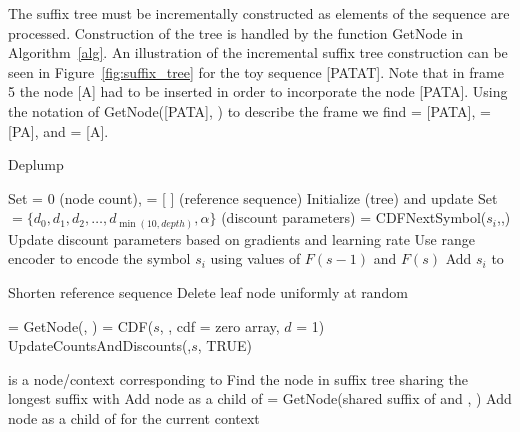 The suffix tree must be incrementally constructed as elements of the sequence are processed.  Construction of the tree is handled by the function GetNode in Algorithm~\ref{alg}.  An illustration of the incremental suffix tree construction can be seen in Figure~\ref{fig:suffix_tree} for the toy sequence [PATAT].  Note that in frame 5 the node [A] had to be inserted in order to incorporate the node [PATA].  Using the notation of GetNode([PATA], \T) to describe the frame we find \N \space = [PATA], \M \space = [PA],  and \PP\space = [A].

\begin{algorithm}
    \caption{Deplump} \label{alg}
    \begin{algorithmic}[1]
    
		\State Set \nc \space = 0 (node count), \RS \space = [ ] (reference sequence)
		\State Initialize \T \space (tree) and update \nc
		\State Set \D \space $= \{ d_0, d_1, d_2, \dots, d_{\min(10,depth)}, \alpha \}$ (discount parameters)
			\State [$F(s-1), F(s)$] = CDFNextSymbol($s_i$,\T,\RS)
			\State Update discount parameters based on gradients and learning rate
			\State Use range encoder to encode the symbol $s_i$ using values of $F(s-1)$ and  $F(s)$
			\State Add $s_i$ to \RS
		\EndFor
	\EndProcedure
	
			\State Shorten reference sequence
		\EndWhile
			\State Delete leaf node uniformly at random
		\EndWhile
		
		\State \N =  GetNode(\RS, \T)
		\State [$F(s-1), F(s)$] = CDF($s$, \N, cdf = zero array, $d$ = 1)
		\State UpdateCountsAndDiscounts(\N,$s$, TRUE)
		\State \Return [$F(s-1), F(s)$]
	\EndFunction
	
		\State \N \space is a node/context corresponding to \RS
		\State Find the node \M \space in suffix tree sharing the longest suffix with \N
				\State Add node \N \space as a child of \M
				\State \Return \N
			\Else
				\State \Return \M
			\EndIf
		\Else
			\State \PP \space = GetNode(shared suffix of \M \space and \N, \T)
			\State Add node \N as a child of \PP \space for the current context
			\State \Return \N
		\EndIf
	\EndFunction
	 \end{algorithmic}
\end{algorithm}

